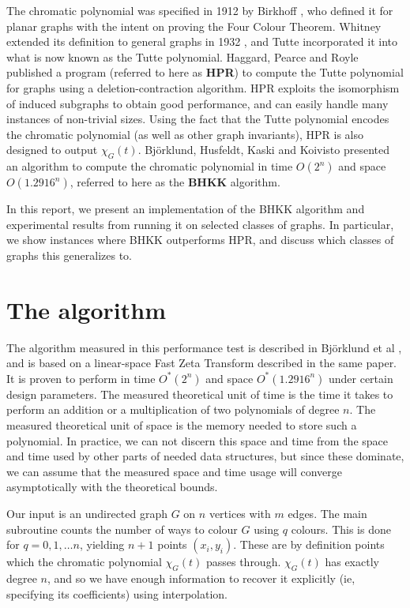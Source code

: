 \documentclass[a4paper]{article}
\begin{document}
The chromatic polynomial was specified in 1912 by Birkhoff \cite{birkhoff}, who defined it for planar graphs with the intent on proving the Four Colour Theorem. Whitney extended its definition to general graphs in 1932 \cite{whitney}, and Tutte incorporated it into what is now known as the Tutte polynomial.
Haggard, Pearce and Royle \cite{haggard} published a program (referred to here as \textbf{HPR}) to compute the Tutte polynomial for graphs using a deletion-contraction algorithm. HPR exploits the isomorphism of induced subgraphs to obtain good performance, and can easily handle many instances of non-trivial sizes. Using the fact that the Tutte polynomial encodes the chromatic polynomial (as well as other graph invariants), HPR is also designed to output $\chi_G(t)$. 
Björklund, Husfeldt, Kaski and Koivisto presented an algorithm to compute the chromatic polynomial in time $O(2^n)$ and space $O(1.2916^n)$, referred to here as the \textbf{BHKK} algorithm. 

In this report, we present an implementation of the BHKK algorithm and experimental results from running it on selected classes of graphs. In particular, we show instances where BHKK outperforms HPR, and discuss which classes of graphs this generalizes to.


\section{The algorithm}
The algorithm measured in this performance test is described in Björklund et al \cite{cov_pack}, and is based on a linear-space Fast Zeta Transform described in the same paper. It is proven to perform in time $O^*(2^n)$ and space $O^*(1.2916^n)$ under certain design parameters. The measured theoretical unit of time is the time it takes to perform an addition or a multiplication of two polynomials of degree $n$. The measured theoretical unit of space is the memory needed to store such a polynomial. In practice, we can not discern this space and time from the space and time used by other parts of needed data structures, but since these dominate, we can assume that the measured space and time usage will converge asymptotically with the theoretical bounds.

Our input is an undirected graph $G$ on $n$ vertices with $m$ edges\footnotemark. The main subroutine counts the number of ways to colour $G$ using $q$ colours. This is done for $q = 0, 1, \ldots n$, yielding $n + 1$ points $(x_i, y_i)$. These are by definition points which the chromatic polynomial $\chi_G(t)$ passes through. $\chi_G(t)$ has exactly degree $n$, and so we have enough information to recover it explicitly (ie, specifying its coefficients) using interpolation.
\end{document}
